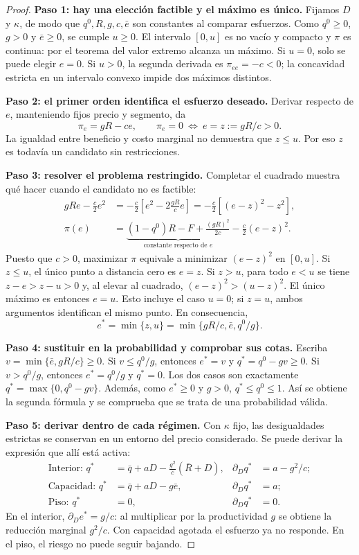 \documentclass[11pt]{article}
\theoremstyle{definition}\newtheorem{assumption}{Supuesto}
\begin{document}
\begin{proof}
\textbf{Paso 1: hay una elección factible y el máximo es único.}
Fijamos $D$ y $\kappa$, de modo que $q^0,R,g,c,\bar e$ son constantes al
comparar esfuerzos. Como $q^0\ge0$, $g>0$ y $\bar e\ge0$, se cumple $u\ge0$.
El intervalo $[0,u]$ es no vacío y compacto y $\pi$ es continua: por el teorema
del valor extremo alcanza un máximo. Si $u=0$, solo se puede elegir $e=0$.
Si $u>0$, la segunda derivada es $\pi_{ee}=-c<0$; la concavidad estricta en
un intervalo convexo impide dos máximos distintos.

\textbf{Paso 2: el primer orden identifica el esfuerzo deseado.}
Derivar respecto de $e$, manteniendo fijos precio y segmento, da
\[
\pi_e=gR-ce,\qquad \pi_e=0\ \Longleftrightarrow\ e=z:=gR/c>0.
\]
La igualdad entre beneficio y costo marginal no demuestra que $z\le u$.
Por eso $z$ es todavía un candidato sin restricciones.

\textbf{Paso 3: resolver el problema restringido.}
Completar el cuadrado muestra qué hacer cuando el candidato no es factible:
\begin{align*}
gRe-\frac c2e^2
 &=-\frac c2\left[e^2-2\frac{gR}{c}e\right]
  =-\frac c2\left[(e-z)^2-z^2\right],\\
\pi(e)&=\underbrace{(1-q^0)R-F+\frac{(gR)^2}{2c}}_{\text{constante respecto de }e}
              -\frac c2(e-z)^2.
\end{align*}
Puesto que $c>0$, maximizar $\pi$ equivale a minimizar $(e-z)^2$ en $[0,u]$.
Si $z\le u$, el único punto a distancia cero es $e=z$. Si $z>u$, para todo
$e<u$ se tiene $z-e>z-u>0$ y, al elevar al cuadrado,
$(e-z)^2>(u-z)^2$. El único máximo es entonces $e=u$. Esto incluye el caso
$u=0$; si $z=u$, ambos argumentos identifican el mismo punto. En consecuencia,
\[
e^*=\min\{z,u\}=\min\{gR/c,\bar e,q^0/g\}.
\]

\textbf{Paso 4: sustituir en la probabilidad y comprobar sus cotas.}
Escriba $v=\min\{\bar e,gR/c\}\ge0$. Si $v\le q^0/g$, entonces $e^*=v$ y
$q^*=q^0-gv\ge0$. Si $v>q^0/g$, entonces $e^*=q^0/g$ y $q^*=0$. Los dos
casos son exactamente $q^*=\max\{0,q^0-gv\}$. Además, como $e^*\ge0$ y
$g>0$, $q^*\le q^0\le1$. Así se obtiene la segunda fórmula y se comprueba
que se trata de una probabilidad válida.

\textbf{Paso 5: derivar dentro de cada régimen.}
Con $\kappa$ fijo, las desigualdades estrictas se conservan en un entorno
del precio considerado. Se puede derivar la expresión que allí está activa:
\begin{align*}
\text{Interior: }q^*&=\bar q+aD-\frac{g^2}{c}(\bar R+D),
 &\partial_Dq^*&=a-g^2/c;\\
\text{Capacidad: }q^*&=\bar q+aD-g\bar e,
 &\partial_Dq^*&=a;\\
\text{Piso: }q^*&=0,
 &\partial_Dq^*&=0.
\end{align*}
En el interior, $\partial_De^*=g/c$: al multiplicar por la productividad $g$
se obtiene la reducción marginal $g^2/c$. Con capacidad agotada el esfuerzo
ya no responde. En el piso, el riesgo no puede seguir bajando.


\end{proof}
\end{document}
